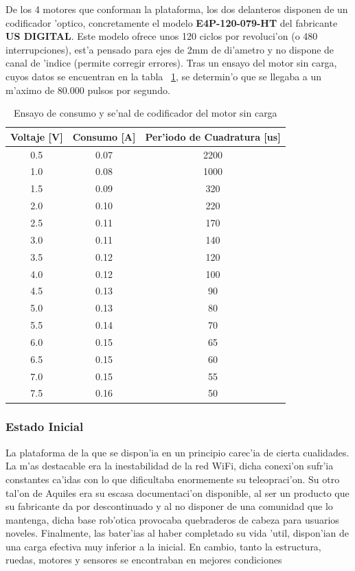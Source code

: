 \documentclass[twoside,12pt]{article}
\begin{document}
De los 4 motores que conforman la plataforma, los dos delanteros disponen de un codificador 'optico, concretamente el modelo \textbf{E4P-120-079-HT} del fabricante \textbf{US DIGITAL}. Este modelo ofrece unos 120 ciclos por revoluci'on (o 480 interrupciones), est'a pensado para ejes de 2mm de di'ametro y no dispone de canal de 'indice (permite corregir errores). Tras un ensayo del motor sin carga, cuyos datos se encuentran en la tabla ~\ref{tab:Encoder periods}, se determin'o que se llegaba a un m'aximo de 80.000 pulsos por segundo.\\

\begin{table}[ht]
\begin{center}
\begin{tabular}{|c|c|c|}
	\hline
	\textbf{Voltaje [V]} & \textbf{Consumo [A]} & \textbf{Per'iodo de Cuadratura [us]} \\ \hline
	0.5 & 0.07 & 2200 \\ \hline
	1.0 & 0.08 & 1000 \\ \hline
	1.5 & 0.09 & 320 \\ \hline
	2.0 & 0.10 & 220 \\ \hline
	2.5 & 0.11 & 170 \\	\hline
	3.0 & 0.11 & 140 \\ \hline
	3.5 & 0.12 & 120 \\ \hline
	4.0 & 0.12 & 100 \\ \hline  
	4.5 & 0.13 & 90 \\ \hline  
	5.0 & 0.13 & 80 \\ \hline
	5.5 & 0.14 & 70 \\ \hline
	6.0 & 0.15 & 65 \\ \hline
	6.5 & 0.15 & 60 \\ \hline
	7.0 & 0.15 & 55 \\ \hline
	7.5 & 0.16 & 50 \\ \hline

\end{tabular}
\end{center}

\caption{Ensayo de consumo y se'nal de codificador del motor sin carga }
\label{tab:Encoder periods}
\end{table}

\subsubsection{Estado Inicial}  
La plataforma de la que se dispon'ia en un principio carec'ia de cierta cualidades. La m'as destacable era la inestabilidad de la red WiFi, dicha conexi'on sufr'ia constantes ca'idas con lo que dificultaba enormemente su teleopraci'on. Su otro tal'on de Aquiles era su escasa documentaci'on disponible, al ser un producto que su fabricante da por descontinuado y al no disponer de una comunidad que lo mantenga, dicha base rob'otica provocaba quebraderos de cabeza para usuarios noveles. Finalmente, las bater'ias al haber completado su vida 'util, dispon'ian de una carga efectiva muy inferior a la inicial. En cambio, tanto la estructura, ruedas, motores y sensores se encontraban en mejores condiciones\\
\newpage
\end{document}
